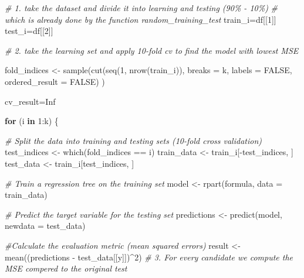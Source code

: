 \documentclass[
]{article}
\newenvironment{Shaded}{\begin{snugshade}}{\end{snugshade}}
\newcommand{\AttributeTok}[1]{\textcolor[rgb]{0.77,0.63,0.00}{#1}}
\newcommand{\CommentTok}[1]{\textcolor[rgb]{0.56,0.35,0.01}{\textit{#1}}}
\newcommand{\ConstantTok}[1]{\textcolor[rgb]{0.00,0.00,0.00}{#1}}
\newcommand{\ControlFlowTok}[1]{\textcolor[rgb]{0.13,0.29,0.53}{\textbf{#1}}}
\newcommand{\DecValTok}[1]{\textcolor[rgb]{0.00,0.00,0.81}{#1}}
\newcommand{\FunctionTok}[1]{\textcolor[rgb]{0.00,0.00,0.00}{#1}}
\newcommand{\NormalTok}[1]{#1}
\newcommand{\OtherTok}[1]{\textcolor[rgb]{0.56,0.35,0.01}{#1}}
\newcommand{\SpecialCharTok}[1]{\textcolor[rgb]{0.00,0.00,0.00}{#1}}
\begin{document}
\begin{Shaded}
\begin{Highlighting}[]
  \CommentTok{\# 1. take the dataset and divide it into learning and testing (90\% {-} 10\%)}
  \CommentTok{\# which is already done by the function random\_training\_test}
\NormalTok{  train\_i}\OtherTok{=}\NormalTok{df[[}\DecValTok{1}\NormalTok{]]}
\NormalTok{  test\_i}\OtherTok{=}\NormalTok{df[[}\DecValTok{2}\NormalTok{]]}
  
  
  \CommentTok{\# 2. take the learning set and apply 10{-}fold cv to find the model with lowest MSE}
  
\NormalTok{  fold\_indices }\OtherTok{\textless{}{-}} \FunctionTok{sample}\NormalTok{(}\FunctionTok{cut}\NormalTok{(}\FunctionTok{seq}\NormalTok{(}\DecValTok{1}\NormalTok{, }\FunctionTok{nrow}\NormalTok{(train\_i)), }\AttributeTok{breaks =}\NormalTok{ k, }\AttributeTok{labels =} \ConstantTok{FALSE}\NormalTok{, }
                             \AttributeTok{ordered\_result =} \ConstantTok{FALSE}\NormalTok{) )}
  
\NormalTok{  cv\_result}\OtherTok{=}\ConstantTok{Inf}
  
  \ControlFlowTok{for}\NormalTok{ (i }\ControlFlowTok{in} \DecValTok{1}\SpecialCharTok{:}\NormalTok{k) \{}

  
  \CommentTok{\# Split the data into training and testing sets (10{-}fold cross validation)}
\NormalTok{  test\_indices }\OtherTok{\textless{}{-}} \FunctionTok{which}\NormalTok{(fold\_indices }\SpecialCharTok{==}\NormalTok{ i)}
\NormalTok{  train\_data }\OtherTok{\textless{}{-}}\NormalTok{ train\_i[}\SpecialCharTok{{-}}\NormalTok{test\_indices, ]}
\NormalTok{  test\_data }\OtherTok{\textless{}{-}}\NormalTok{ train\_i[test\_indices, ]}
  
  
  
  \CommentTok{\# Train a regression tree on the training set}
\NormalTok{  model }\OtherTok{\textless{}{-}} \FunctionTok{rpart}\NormalTok{(formula, }\AttributeTok{data =}\NormalTok{ train\_data)}
  
  \CommentTok{\# Predict the target variable for the testing set}
\NormalTok{  predictions }\OtherTok{\textless{}{-}} \FunctionTok{predict}\NormalTok{(model, }\AttributeTok{newdata =}\NormalTok{ test\_data)}
   
  
  \CommentTok{\#Calculate the evaluation metric (mean squared errors)}
\NormalTok{  result }\OtherTok{\textless{}{-}} \FunctionTok{mean}\NormalTok{((predictions }\SpecialCharTok{{-}}\NormalTok{ test\_data[[y]])}\SpecialCharTok{\^{}}\DecValTok{2}\NormalTok{)}
  \CommentTok{\# 3. For every candidate we compute the MSE compered to the original test}
  

\end{Highlighting}
\end{Shaded}
\end{document}
